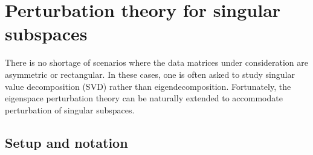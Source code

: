 \section{Perturbation theory for singular subspaces}

There is no shortage of scenarios where the data matrices under consideration are asymmetric or  rectangular. In these cases, one is often asked to study singular value decomposition (SVD) rather than eigendecomposition. Fortunately, the eigenspace perturbation theory can be naturally extended to accommodate perturbation of singular subspaces.

\subsection{Setup and notation}
\label{sec:setup-SVD}


